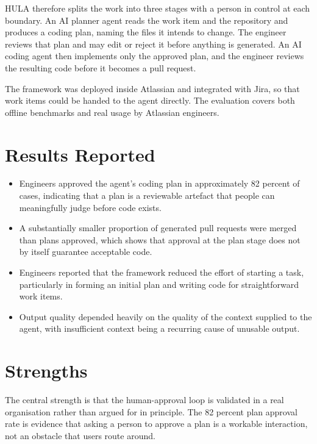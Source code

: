 \documentclass[11pt,a4paper]{article}
\begin{document}
HULA therefore splits the work into three stages with a person in control at
each boundary. An AI planner agent reads the work item and the repository and
produces a coding plan, naming the files it intends to change. The engineer
reviews that plan and may edit or reject it before anything is generated. An AI
coding agent then implements only the approved plan, and the engineer reviews
the resulting code before it becomes a pull request.

The framework was deployed inside Atlassian and integrated with Jira, so that
work items could be handed to the agent directly. The evaluation covers both
offline benchmarks and real usage by Atlassian engineers.

\section{Results Reported}

\begin{itemize}
  \item Engineers approved the agent's coding plan in approximately 82 percent
        of cases, indicating that a plan is a reviewable artefact that people
        can meaningfully judge before code exists.
  \item A substantially smaller proportion of generated pull requests were
        merged than plans approved, which shows that approval at the plan stage
        does not by itself guarantee acceptable code.
  \item Engineers reported that the framework reduced the effort of starting a
        task, particularly in forming an initial plan and writing code for
        straightforward work items.
  \item Output quality depended heavily on the quality of the context supplied
        to the agent, with insufficient context being a recurring cause of
        unusable output.
\end{itemize}

\section{Strengths}

The central strength is that the human-approval loop is validated in a real
organisation rather than argued for in principle. The 82 percent plan approval
rate is evidence that asking a person to approve a plan is a workable
interaction, not an obstacle that users route around.
\end{document}

